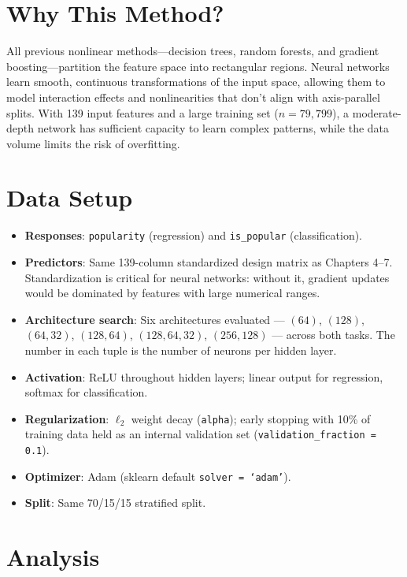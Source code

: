 \documentclass[12pt, oneside]{book}
\begin{document}
\section{Why This Method?}
 
All previous nonlinear methods—decision trees, random forests, and gradient boosting—partition the feature space into rectangular regions. Neural networks learn smooth, continuous transformations of the input space, allowing them to model interaction effects and nonlinearities that don't align with axis-parallel splits. With 139 input features and a large training set ($n = 79{,}799$), a moderate-depth network has sufficient capacity to learn complex patterns, while the data volume limits the risk of overfitting.
 
\section{Data Setup}
 
\begin{itemize}
    \item \textbf{Responses}: \texttt{popularity} (regression) and \texttt{is\_popular} (classification).
    \item \textbf{Predictors}: Same 139-column standardized design matrix as Chapters 4--7. Standardization is critical for neural networks: without it, gradient updates would be dominated by features with large numerical ranges.
    \item \textbf{Architecture search}: Six architectures evaluated --- $(64)$, $(128)$, $(64, 32)$, $(128, 64)$, $(128, 64, 32)$, $(256, 128)$ --- across both tasks. The number in each tuple is the number of neurons per hidden layer.
    \item \textbf{Activation}: ReLU throughout hidden layers; linear output for regression, softmax for classification.
    \item \textbf{Regularization}: $\ell_2$ weight decay (\texttt{alpha}); early stopping with 10\% of training data held as an internal validation set (\texttt{validation\_fraction = 0.1}).
    \item \textbf{Optimizer}: Adam (sklearn default \texttt{solver = `adam'}).
    \item \textbf{Split}: Same 70/15/15 stratified split.
\end{itemize}
 
\section{Analysis}
 
\end{document}

